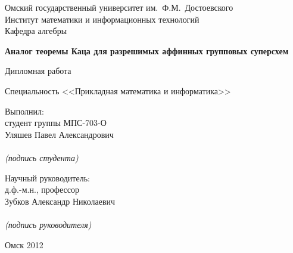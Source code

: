 \begin{titlepage}
  \newpage

  \begin{center}
    \begin{bf}
      Омский государственный университет им.~Ф.М.~Достоевского\\
        \vspace{2mm}
      Институт математики и информационных технологий \\
        \vspace{2mm}
      Кафедра алгебры
    \end{bf}

    \vfill\vfill

    \begin{LARGE}
      \textbf{Аналог теоремы Каца для разрешимых аффинных групповых суперсхем} \\
    \end{LARGE}

    \begin{Large}
      Дипломная работа \\
    \end{Large}
    Специальность <<Прикладная математика и информатика>>
  \end{center}

  \vfill

  \hfill \parbox{7cm}{
        Выполнил: \\
        студент группы МПС-703-О \\
        Уляшев Павел Александрович \\
        \underline{{}\hspace{5cm}{}} \\
        \vspace{-0.7mm}
        \textit{(подпись студента)}

        \vspace{8mm}

        Научный руководитель: \\
        д.ф.-м.н., профессор \\
        Зубков Александр Николаевич \\
        \underline{{}\hspace{5cm}{}} \\
        \vspace{-0.7mm}
        \textit{(подпись руководителя)}
    }

  \vfill

  \begin{center}
    \large Омск 2012
  \end{center}
\end{titlepage}
